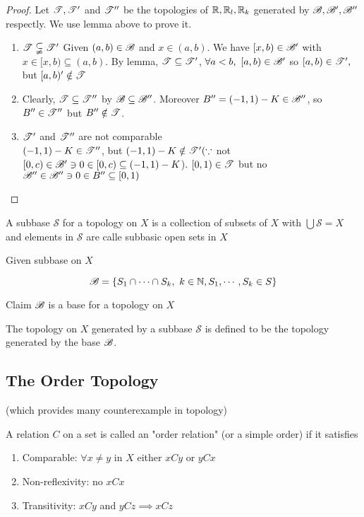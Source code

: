 \begin{proof}
	Let $\mathscr{T},\mathscr{T}'$ and $\mathscr{T}''$ be the topologies of $\mathbb{R},\mathbb{R}_l,\mathbb{R}_k$ generated by $\mathscr{B},\mathscr{B}',\mathscr{B}''$ respectly. We use lemma above to prove it.
	\begin{enumerate}[label = $\star$]
		\item $\mathscr{T} \subsetneqq \mathscr{T}'$
		Given $(a,b) \in \mathscr{B}$ and $x \in (a,b)$. We have $[x,b) \in \mathscr{B}'$ with $x \in [x,b) \subseteq (a,b)$. By lemma, $\mathscr{T} \subseteq \mathscr{T}'$, $\forall a<b,~[a,b) \in \mathscr{B}'$ so $[a,b) \in \mathscr{T}',$ but $[a,b)' \notin \mathscr{T}$
		\item Clearly, $\mathscr{T} \subseteq \mathscr{T}''$ by $\mathscr{B} \subseteq \mathscr{B}''$. Moreover $B'' = (-1,1) - K \in \mathscr{B}''$, so $B'' \in \mathscr{T}''$ but $B'' \notin \mathscr{T}$.
		\item $\mathscr{T}'$ and $\mathscr{T}''$ are not comparable\\
		$(-1,1) - K \in \mathscr{T}''$, but $(-1,1) - K \notin \mathscr{T}'(\because$ not $[0,c) \in \mathscr{B}' \ni 0 \in [0,c) \subseteq (-1,1) - K$). $[0,1) \in \mathscr{T}$ but no $\mathscr{B}'' \in \mathscr{B}'' \ni 0 \in B'' \subseteq [0,1)$
	\end{enumerate} 
\end{proof}

\begin{defn}
	A subbase $\mathscr{S}$ for a topology on $X$ is a collection of subsets of $X$ with $\bigcup \mathscr{S} = X$ and elements in $\mathscr{S}$ are calle subbasic open sets in $X$
\end{defn}

Given subbase on $X$

$$\mathscr{B} = \{S_1 \cap \cdots \cap S_k,~k \in \mathbb{N},S_1,\cdots,S_k \in S\}$$

Claim $\mathscr{B}$ is a base for a topology on $X$

\begin{defn}
	The topology on $X$ generated by a subbase $\mathscr{S}$ is defined to be the topology generated by the base $\mathscr{B}$.
\end{defn}

\subsection*{The Order Topology}

(which provides many counterexample in topology)

\begin{defn}
	A relation $C$ on a set is called an "order relation"  (or a simple order) if it satisfies
	\begin{enumerate}
		\item Comparable: $\forall x \neq y$ in $X$ either $xCy$ or $yCx$
		\item Non-reflexivity: no $xCx$
		\item Transitivity: $xCy$ and $yCz \implies xCz$
	\end{enumerate}
\end{defn}

